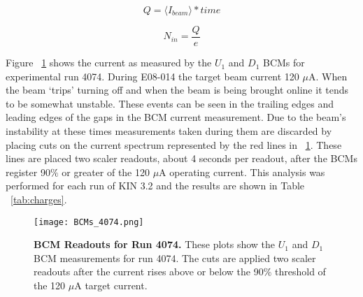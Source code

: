 \begin{equation} \label{eq:charge}
	Q = \langle I_{beam} \rangle *time
\end{equation}

\begin{equation} \label{eq:electrons}
	N_{in} = \frac{Q}{e}
\end{equation}

Figure ~\ref{fig:bcms_4074} shows the current as measured by the $U_1$ and $D_1$ BCMs for experimental run 4074. During E08-014 the target beam current 120 $\mu$A. When the beam `trips' turning off and when the beam is being brought online it tends to be somewhat unstable. These events can be seen in the trailing edges and leading edges of the gaps in the BCM current measurement. Due to the beam's instability at these times measurements taken during them are discarded by placing cuts on the current spectrum represented by the red lines in ~\ref{fig:bcms_4074}. These lines are placed two scaler readouts, about 4 seconds per readout, after the BCMs register 90$\%$ or greater of the 120 $\mu$A operating current. This analysis was performed for each run of KIN 3.2 and the results are shown in Table ~\ref{tab:charges}.

\begin{figure}[!ht]
\begin{center}
\texttt{[image: BCMs\_4074.png]}
\end{center}
\caption{
{\bf{BCM Readouts for Run 4074.}} These plots show the $U_1$ and $D_1$ BCM measurements for run 4074. The cuts are applied two scaler readouts after the current rises above or below the 90$\%$ threshold of the 120 $\mu$A target current.}
\label{fig:bcms_4074}
\end{figure}

